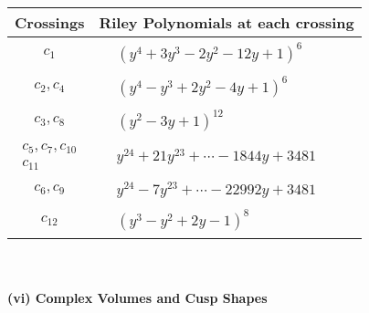 \documentclass[1p]{elsarticle_modified}
\theoremstyle{definition}
\begin{document}
\begin{tabular}{m{50pt}|m{274pt}}
Crossings & \hspace{64pt}Riley Polynomials at each crossing \\
\hline $$\begin{aligned}c_{1}\end{aligned}$$&$\begin{aligned}
&(y^4+3 y^3-2 y^2-12 y+1)^6
\end{aligned}$\\
\hline $$\begin{aligned}c_{2},c_{4}\end{aligned}$$&$\begin{aligned}
&(y^4- y^3+2 y^2-4 y+1)^6
\end{aligned}$\\
\hline $$\begin{aligned}c_{3},c_{8}\end{aligned}$$&$\begin{aligned}
&(y^2-3 y+1)^{12}
\end{aligned}$\\
\hline $$\begin{aligned}c_{5},c_{7},c_{10}\\c_{11}\end{aligned}$$&$\begin{aligned}
&y^{24}+21 y^{23}+\cdots-1844 y+3481
\end{aligned}$\\
\hline $$\begin{aligned}c_{6},c_{9}\end{aligned}$$&$\begin{aligned}
&y^{24}-7 y^{23}+\cdots-22992 y+3481
\end{aligned}$\\
\hline $$\begin{aligned}c_{12}\end{aligned}$$&$\begin{aligned}
&(y^3- y^2+2 y-1)^8
\end{aligned}$\\
\hline
\end{tabular}\\~\\
\newpage\flushleft \textbf{(vi) Complex Volumes and Cusp Shapes}
\end{document}
